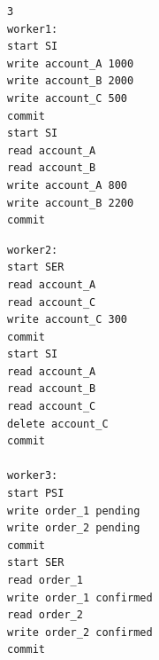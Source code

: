 \documentclass[varwidth]{standalone}
\begin{document}
\noindent
\begin{minipage}[t]{0.48\linewidth}
\begin{verbatim}
3
worker1:
start SI
write account_A 1000
write account_B 2000
write account_C 500
commit
start SI
read account_A
read account_B
write account_A 800
write account_B 2200
commit
\end{verbatim}
\end{minipage}%
\hfill
\begin{minipage}[t]{0.48\linewidth}
\begin{verbatim}
worker2:
start SER
read account_A
read account_C
write account_C 300
commit
start SI
read account_A
read account_B
read account_C
delete account_C
commit

worker3:
start PSI
write order_1 pending
write order_2 pending
commit
start SER
read order_1
write order_1 confirmed
read order_2
write order_2 confirmed
commit
\end{verbatim}
\end{minipage}
\end{document}
